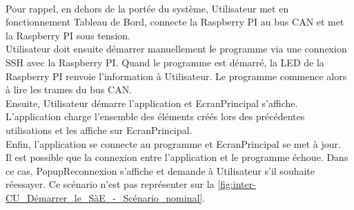 \\
Pour rappel, en dehors de la portée du système, Utilisateur met en fonctionnement Tableau de Bord, connecte la Raspberry PI au bus CAN et met la Raspberry PI sous tension.\\
Utilisateur doit ensuite démarrer manuellement le programme {\nomLogiciel} via une connexion SSH avec la Raspberry PI. Quand le programme {\nomLogiciel} est démarré, la LED de la Raspberry PI renvoie l'information à Utilisateur. Le programme {\nomLogiciel} commence alors à lire les trames du bus CAN.\\
Ensuite, Utilisateur démarre l'application {\nomApplication} et EcranPrincipal s'affiche. L'application {\nomApplication} charge l'ensemble des éléments créés lors des précédentes utilisations et les affiche sur EcranPrincipal.\\
Enfin, l'application {\nomApplication} se connecte au programme {\nomLogiciel} et EcranPrincipal se met à jour.\\
Il est possible que la connexion entre l'application {\nomApplication} et le programme {\nomLogiciel} échoue. Dans ce cas, PopupReconnexion s'affiche et demande à Utilisateur s'il souhaite réessayer. Ce scénario n'est pas représenter sur la \autoref{fig:inter-CU_Démarrer_le_SàE_-_Scénario_nominal}.\\
